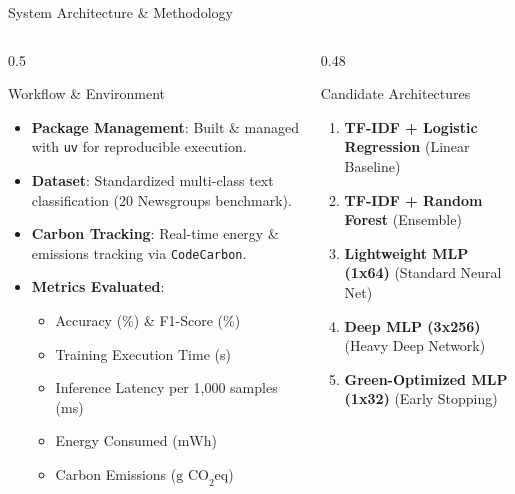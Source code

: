\documentclass[aspectratio=169, 10pt]{beamer}
\begin{document}
\begin{frame}{System Architecture \& Methodology}
    \begin{columns}
        \begin{column}{0.5\textwidth}
            \begin{block}{Workflow \& Environment}
                \begin{itemize}
                    \item \textbf{Package Management}: Built \& managed with \texttt{uv} for reproducible execution.
                    \item \textbf{Dataset}: Standardized multi-class text classification (20 Newsgroups benchmark).
                    \item \textbf{Carbon Tracking}: Real-time energy \& emissions tracking via \texttt{CodeCarbon}.
                    \item \textbf{Metrics Evaluated}:
                        \begin{itemize}
                            \item Accuracy (\%) \& F1-Score (\%)
                            \item Training Execution Time (s)
                            \item Inference Latency per 1,000 samples (ms)
                            \item Energy Consumed ($\text{mWh}$)
                            \item Carbon Emissions ($\text{g CO}_2\text{eq}$)
                        \end{itemize}
                \end{itemize}
            \end{block}
        \end{column}
        
        \begin{column}{0.48\textwidth}
            \begin{block}{Candidate Architectures}
                \small
                \begin{enumerate}
                    \item \textbf{TF-IDF + Logistic Regression} (Linear Baseline)
                    \item \textbf{TF-IDF + Random Forest} (Ensemble)
                    \item \textbf{Lightweight MLP (1x64)} (Standard Neural Net)
                    \item \textbf{Deep MLP (3x256)} (Heavy Deep Network)
                    \item \textbf{Green-Optimized MLP (1x32)} (Early Stopping)
                \end{enumerate}
            \end{block}
        \end{column}
    \end{columns}
\end{frame}
\end{document}
